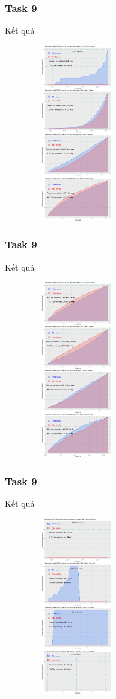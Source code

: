 \documentclass[english,10pt,table]{beamer}
\begin{document}
\frame
{
    \frametitle{Task 9}
    \begin{block}{Kết quả}
	\begin{figure}[H]
		\centering
		\includegraphics[height=7.7cm,width=4.2cm]{images/9.1.png}
	\end{figure}
    \end{block}
}
\frame
{
    \frametitle{Task 9}
    \begin{block}{Kết quả}
	\begin{figure}[H]
		\centering
		\includegraphics[height=7.7cm,width=4.2cm]{images/9.2.png}
	\end{figure}
    \end{block}
}
\frame
{
    \frametitle{Task 9}
    \begin{block}{Kết quả}
	\begin{figure}[H]
		\centering
		\includegraphics[height=7.7cm,width=4.2cm]{images/9.3.png}
	\end{figure}
    \end{block}
}
\end{document}
